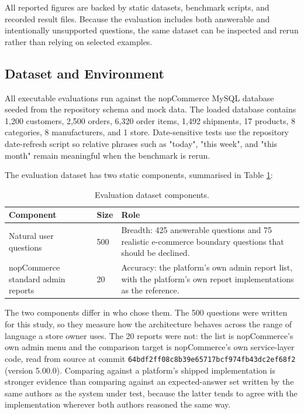 \documentclass[pdflatex,sn-mathphys-num]{sn-jnl}
\begin{document}
All reported figures are backed by static datasets, benchmark scripts, and recorded result files. Because the evaluation includes both answerable and intentionally unsupported questions, the same dataset can be inspected and rerun rather than relying on selected examples.


\subsection{Dataset and Environment}

All executable evaluations run against the nopCommerce MySQL database seeded from the repository schema and mock data. The loaded database contains 1,200 customers, 2,500 orders, 6,320 order items, 1,492 shipments, 17 products, 8 categories, 8 manufacturers, and 1 store. Date-sensitive tests use the repository date-refresh script so relative phrases such as "today", "this week", and "this month" remain meaningful when the benchmark is rerun.


The evaluation dataset has two static components, summarised in Table \ref{tab:3}:


\begin{table}[t]
\caption{Evaluation dataset components.}
\label{tab:3}
\centering
\renewcommand{\arraystretch}{1.15}
\begin{tabular}{p{}lp{}}
\toprule
Component & Size & Role \\
\midrule
Natural user questions & 500 & Breadth: 425 answerable questions and 75 realistic e-commerce boundary questions that should be declined. \\
nopCommerce standard admin reports & 20 & Accuracy: the platform's own admin report list, with the platform's own report implementations as the reference. \\
\bottomrule
\end{tabular}
\end{table}

The two components differ in who chose them. The 500 questions were written for this study, so they measure how the architecture behaves across the range of language a store owner uses. The 20 reports were not: the list is nopCommerce's own admin menu and the comparison target is nopCommerce's own service-layer code, read from source at commit \texttt{64bdf2ff08c8b39e65717bcf974fb43dc2ef68f2} (version 5.00.0). Comparing against a platform's shipped implementation is stronger evidence than comparing against an expected-answer set written by the same authors as the system under test, because the latter tends to agree with the implementation wherever both authors reasoned the same way.
\end{document}
